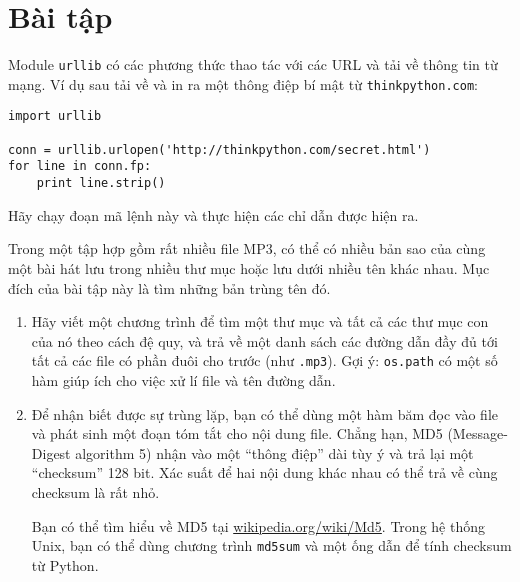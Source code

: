 \documentclass[11pt]{book}
\begin{document}
\section{Bài tập}

\begin{ex}
\label{urllib}


Module {\tt urllib} có các phương thức thao tác với các URL
và tải về thông tin từ mạng. Ví dụ sau tải về và in ra một
thông điệp bí mật từ {\tt thinkpython.com}:

\beforeverb
\begin{verbatim}
import urllib

conn = urllib.urlopen('http://thinkpython.com/secret.html')
for line in conn.fp:
    print line.strip()
\end{verbatim}
\afterverb

Hãy chạy đoạn mã lệnh này và thực hiện các chỉ dẫn được
hiện ra.


\end{ex}

\begin{ex}
\label{checksum}


Trong một tập hợp gồm rất nhiều file MP3, có thể có nhiều bản sao
của cùng một bài hát lưu trong nhiều thư mục hoặc lưu dưới
nhiều tên khác nhau. Mục đích của bài tập này là tìm những
bản trùng tên đó.

\begin{enumerate}

\item Hãy viết một chương trình để tìm một thư mục và tất cả
các thư mục con của nó theo cách đệ quy, và trả về một danh sách
các đường dẫn đầy đủ tới tất cả các file có phần đuôi cho trước
(như {\tt .mp3}).
Gợi ý: {\tt os.path} có một số hàm giúp ích cho việc xử lí file và
tên đường dẫn.


\item Để nhận biết được sự trùng lặp, bạn có thể dùng một
hàm băm đọc vào file và phát sinh một đoạn tóm tắt cho nội dung file.
Chẳng hạn, MD5 (Message-Digest algorithm 5) nhận vào một 
``thông điệp'' dài tùy ý và trả lại một ``checksum'' 128 bit. Xác suất
để hai nội dung khác nhau có thể trả về cùng checksum là rất nhỏ.

Bạn có thể tìm hiểu về MD5 tại \url{wikipedia.org/wiki/Md5}.  Trong
hệ thống Unix, bạn có thể dùng chương trình {\tt md5sum} và một ống dẫn
để tính checksum từ Python.


\end{enumerate}

\end{ex}
\end{document}
